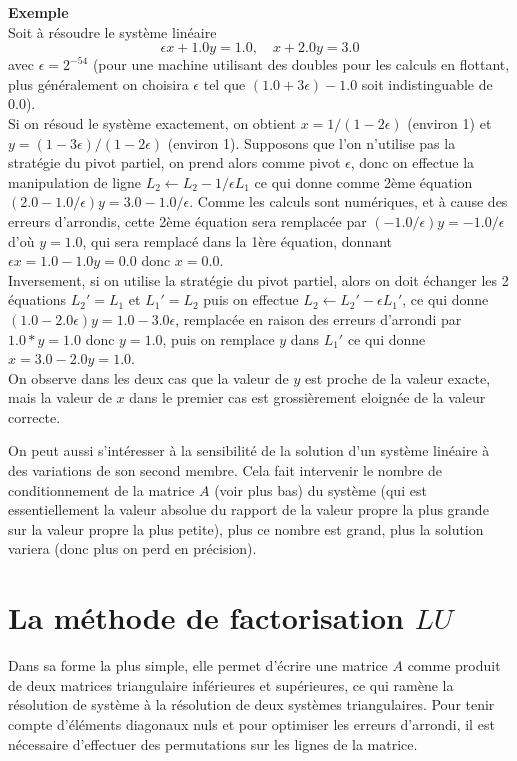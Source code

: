 \documentclass[a4paper,11pt]{book}
\begin{document}
\begin{giacjshere}
{\bf Exemple}\\
Soit \`a r\'esoudre le syst\`eme lin\'eaire
\[ \epsilon x + 1.0 y = 1.0 , \quad x + 2.0 y = 3.0 \]
avec $\epsilon =2^{-54}$ (pour une machine utilisant des doubles pour
les calculs en flottant,
plus g\'en\'eralement on choisira $\epsilon$ tel que $(1.0+3\epsilon)-1.0$
soit indistinguable de 0.0).\\
Si on r\'esoud le syst\`eme exactement,
on obtient $x=1/(1-2\epsilon)$ (environ 1)
et $y=(1-3\epsilon)/(1-2\epsilon)$ (environ 1).
Supposons que l'on n'utilise pas la strat\'egie du pivot partiel,
on prend alors comme pivot $\epsilon$, donc on effectue la
manipulation de ligne $L_2 \leftarrow L_2 - 1/\epsilon L_1$ ce qui
donne comme 2\`eme \'equation $(2.0-1.0/\epsilon)y=3.0-1.0/\epsilon$.
Comme les calculs sont num\'eriques, et \`a cause des erreurs
d'arrondis, cette 2\`eme \'equation sera remplac\'ee par
$(-1.0/\epsilon)y=-1.0/\epsilon$ d'o\`u $y=1.0$, qui sera remplac\'e
dans la 1\`ere \'equation, donnant $\epsilon x = 1.0-1.0y=0.0$ donc
$x=0.0$.\\
Inversement, si on utilise la strat\'egie du pivot partiel, alors
on doit \'echanger les 2 \'equations $L_2'=L_1$ et $L_1'=L_2$ puis on effectue
$L_2 \leftarrow L_2' - \epsilon L_1'$, ce qui donne
$(1.0-2.0\epsilon) y = 1.0 - 3.0 \epsilon $, remplac\'ee en raison
des erreurs d'arrondi par $1.0*y=1.0$ donc $y=1.0$, puis on remplace
$y$ dans $L_1'$ ce qui donne $x=3.0-2.0y=1.0$.\\
On observe dans les deux cas que la valeur de $y$ est proche de la
valeur exacte, mais la valeur de $x$ dans le premier cas est
grossi\`erement eloign\'ee de la valeur correcte.

On peut aussi s'intéresser à la sensibilité de la solution d'un
système linéaire à des variations de son second membre. Cela fait intervenir
le nombre de conditionnement de la matrice $A$ (voir plus bas) du système (qui
est essentiellement la valeur absolue du rapport de la valeur propre
la plus grande sur la valeur propre la plus petite), plus
ce nombre est grand, plus la solution variera (donc plus on
perd en précision).

\section{La méthode de factorisation $LU$} 
 \label{sec:LU}
Dans sa forme la plus simple, elle permet d'écrire
une matrice $A$ comme produit de deux matrices triangulaire
inférieures et supérieures, ce qui ram\`ene la résolution
de système à la résolution de deux systèmes triangulaires.
Pour tenir compte d'\'el\'ements diagonaux nuls et pour optimiser 
les erreurs d'arrondi, il est n\'ecessaire d'effectuer des
permutations sur les lignes de la matrice.


\end{giacjshere}
\end{document}
